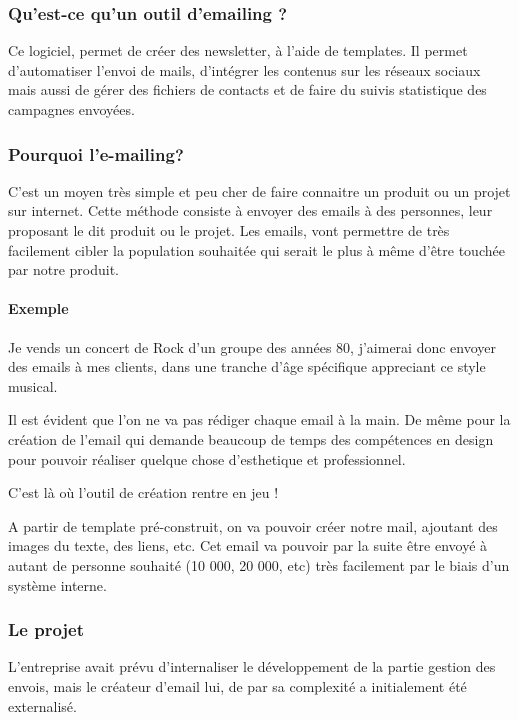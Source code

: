 \subsubsection{Qu'est-ce qu'un outil d'emailing ?}
Ce logiciel, permet de créer des \gls{newsletter}, à l'aide de \gls{templates}.
Il permet d'automatiser l'envoi de mails, d'intégrer les contenus sur les réseaux sociaux mais aussi de gérer des fichiers de contacts et de faire du suivis statistique des campagnes envoyées. 

\subsubsection{Pourquoi l'e-mailing?}
C'est un moyen très simple et peu cher de faire connaitre un produit ou un projet sur internet.
Cette méthode consiste à envoyer des emails à des personnes, leur proposant le dit produit ou le projet. 
Les emails, vont permettre de très facilement cibler la population souhaitée qui serait le plus à même d'être touchée par notre produit. 

\paragraph{Exemple} Je vends un concert de Rock d'un groupe des années 80, j'aimerai donc envoyer des emails à mes clients, dans une tranche d'âge spécifique appreciant ce style musical. 

Il est évident que l'on ne va pas rédiger chaque email à la main. 
De même pour la création de l'email qui demande beaucoup de temps des compétences en design pour pouvoir réaliser quelque chose d'esthetique et professionnel. 

C'est là où l'outil de création rentre en jeu !

A partir de template pré-construit, on va pouvoir créer notre mail, ajoutant des images du texte, des liens, etc. 
Cet email va pouvoir par la suite être envoyé à autant de personne souhaité (10 000, 20 000, etc) très facilement par le biais d'un système interne. 

\subsubsection{Le projet}
L'entreprise avait prévu d'internaliser le développement de la partie gestion des envois, mais le créateur d'email lui, de par sa complexité a initialement été externalisé.


